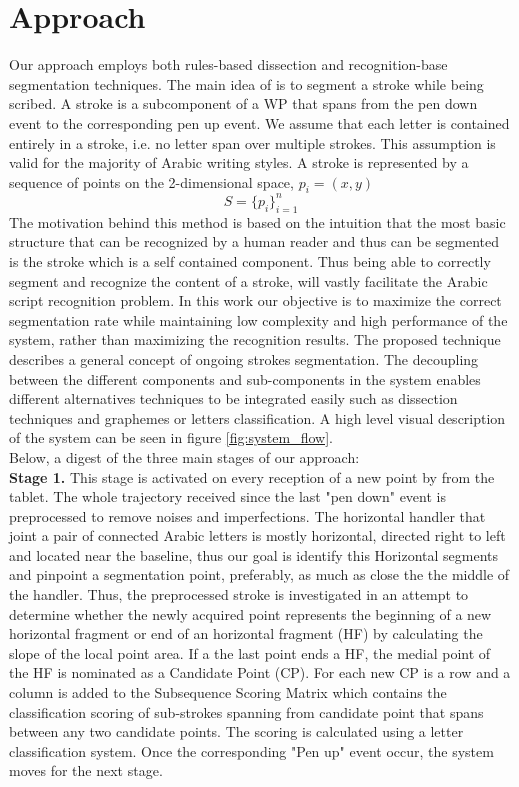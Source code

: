 \documentclass[journal,compsoc]{IEEEtran}
\begin{document}
\section{Approach}
\label{sec:approach}
Our approach employs both rules-based dissection and recognition-base segmentation techniques. The main idea of is to  segment a stroke while being scribed. A stroke is a subcomponent of a WP that spans from the pen down event to the corresponding pen up event. We assume that each letter is contained entirely in a stroke, i.e. no letter span over multiple strokes. This assumption is valid for the majority of Arabic writing styles. 
A stroke is represented by a sequence of points on the 2-dimensional space, $p_{i}=(x,y)$ 
\begin{equation}
S=\{p_{i}\}_{i=1}^{n}
\end{equation}
The motivation behind this method is based on the intuition that the most basic structure that can be recognized by a human reader and thus can be segmented is the stroke which is a self contained component. Thus being able to correctly segment and recognize the content of a stroke, will vastly facilitate the Arabic script recognition problem. In this work our objective is to maximize the correct segmentation rate while maintaining low complexity and high performance of the system, rather than maximizing the recognition results. 
The proposed technique describes a general concept of ongoing strokes segmentation. The decoupling between the different components and sub-components in the system enables different alternatives techniques to be integrated easily such as dissection techniques and graphemes or letters classification. A high level visual description of the system can be seen in figure \ref{fig:system_flow}.\\

Below, a digest of the three main stages of our approach: \\

\textbf{Stage 1.} This stage is activated on every reception of a new point by from the tablet. The whole trajectory received since the last "pen down" event is preprocessed to remove noises and imperfections. The horizontal handler that joint a pair of connected Arabic letters is mostly horizontal, directed right to left and located near the baseline, thus our goal is identify this Horizontal segments and pinpoint a segmentation point, preferably, as much as close the the middle of the handler. Thus, the preprocessed stroke is investigated in an attempt to determine whether the newly acquired point represents the beginning of a new horizontal fragment or end of an horizontal fragment (HF) by calculating the slope of the local point area. If a the last point ends a HF, the medial point of the HF is nominated as a Candidate Point (CP). For each new CP is a row and a column is added to the Subsequence Scoring Matrix which contains the classification scoring of sub-strokes spanning from candidate point that spans between any two candidate points. The scoring is calculated using a letter classification system. Once the corresponding "Pen up" event occur, the system moves for the next stage.\\ 
\end{document}

